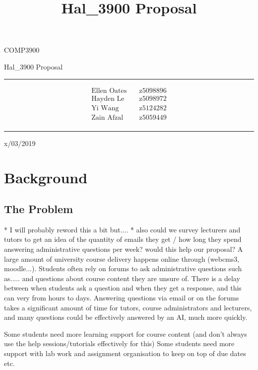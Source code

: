 \documentclass{article}
\title{Hal\_3900 Proposal}
\begin{document}
\begin{LARGE}
\begin{center}
\vspace*{15mm}

COMP3900

Hal\_3900 Proposal

\rule[4.5pt]{0.61\textwidth}{0.3pt}

\begin{align*}
  \text{Ellen Oates}    \quad   &\text{z5098896} \\
  \text{Hayden Le}      \quad   &\text{z5098972} \\
  \text{Yi Wang}        \quad   &\text{z5124282} \\
  \text{Zain Afzal}     \quad   &\text{z5059449} \\
\end{align*}

\rule[4.5pt]{0.61\textwidth}{0.3pt}

x/03/2019

\end{center}
\end{LARGE}
\newpage


\section{Background}
\subsection{The Problem}
* I will probably reword this a bit but....
* also could we survey lecturers and tutors to get an idea of the quantity of emails they get / 
how long they spend answering administrative questions per week? would this help our proposal?
A large amount of university course delivery happens online through (webcms3, moodle...). Students 
often rely on forums to ask administrative questions such as.....  and questions about course content they are unsure of.
There is a delay between when students ask a question and when they get a response, and this can very from hours to days.
Answering questions via email or on the forums takes a significant amount of time for tutors, course administrators and lecturers, 
and many questions could be effectively answered by an AI, much more quickly.

Some students need more learning support for course content (and don't always use the help sessions/tutorials effectively for this)
Some students need more support with lab work and assignment organisation to keep on top of due dates etc. 
\end{document}
